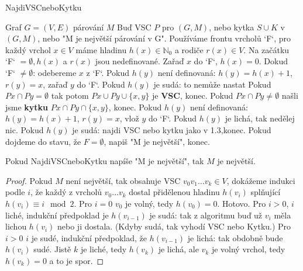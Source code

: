 \begin{algorithm}[!h]
	\caption{NajdiVSCneboKytku}
	\begin{algorithmic}[1]
		\Require Graf $G= (V,E)$ párování $M$
		\Ensure Buď VSC $P$ pro $(G,M)$, nebo kytka $S \cup K$ v $(G,M)$, nebo "M je největší párování v G".
		\State Používáme frontu vrcholů `F`, pro každý vrchol $x \in V$ máme hladinu $h(x) \in \mathbb{N}_{0}$ a rodiče $r(x) \in V$.
		\State Na začátku `F` $= \emptyset, h(x)$ a $r(x)$ jsou nedefinované.
		\State Zařaď $x$ do `F`, $h(x) = 0$.
		\EndFor
		\State Dokud `F` $\neq \emptyset$: odebereme $x$ z `F`.
			\State Pokud $h(y)$ není definovaná: $h(y) = h(x) +1$, $r(y)=x$, zařaď $y$ do `F`.
			\State Pokud $h(y)$ je sudá: to nemůže nastat
				\State Pokud $Px \cap Py = \emptyset$ tak potom $Px \cup Py \cup \{x,y\}$ je \textbf{VSC}, konec.
				\State Pokud $Px \cap Py \neq \emptyset$ našli jsme \textbf{kytku} $Px \cap Py \cap \{x,y\}$, konec.
			\EndIf
			\State Pokud $h(y)$ není definovaná: $h(y) = h(x) +1$, $r(y) = x$, vlož $y$ do `F`.
			\State Pokud $h(y)$ je lichá, tak nedělej nic.
			\State Pokud $h(y)$ je sudá: najdi VSC nebo kytku jako v 1.3,konec.
		\EndIf
		\State Pokud dojdeme do stavu, že $F = \emptyset$, napiš "M je největší", konec.
	\end{algorithmic}
\end{algorithm}

\begin{lemma}
	Pokud NajdiVSCneboKytku napíše "M je největší", tak $M$ je největší.
\end{lemma}

\begin{proof}
	Pokud $M$ není největší, tak obsahuje VSC $v_{0} v_{1} \dots v_{k} \in V$, dokážeme indukci podle $i$, že každý z vrcholů $v_{0} \dots v_{k}$ dostal přidělenou hladinu $h(v_{i})$ splňující $h(v_{i}) \equiv i \mod 2$. Pro $i=0$ $v_{0}$ je volný, tedy $h(v_{0})= 0$. Hotovo. Pro $i > 0$, $i$ liché, indukční předpoklad je $h(v_{i-1})$ je sudá: tak z algoritmu buď už $v_{i}$ měla lichou $h(v_{i})$ nebo ji dostala. (Kdyby sudá, tak vyhodí VSC nebo Kytku.) Pro $i>0$ $i$ je sudé, indukční předpoklad, že $h(v_{i-1})$ je lichá: tak obdobně bude $h(v_{i})$ sudé. Jistě $k$ je liché, tedy $h(v_{k})$ je lichá, ale $v_{k}$ je volný vrchol, tedy $h(v_{k}) =0$ a to je spor.
\end{proof}


